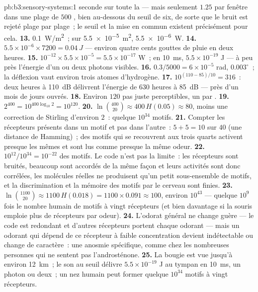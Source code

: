 \begin{solution}{pb:b3:sensory-systems:1}
seconde sur toute la  --- mais seulement $1.25$ par fenêtre dans
une plage de $500$ , bien au-dessous du seuil de six, de sorte
que le bruit est rejeté plage par plage~; le seuil et la mise en commun
existent précisément pour cela.
\textbf{13.} \qty{0.1}{W/m^2}~; sur \qty{5.5e-5}{m^2}, \qty{5.5e-6}{W}.
\textbf{14.} $5.5\times 10^{-6}\times 7200 = \qty{0.04}{J}$ --- environ
quatre cents gouttes de pluie en deux heures.
\textbf{15.} $10^{-12}\times 5.5\times 10^{-5} = 5.5\times 10^{-17}$ W~;
en \qty{10}{ms}, $5.5\times 10^{-19}$ J --- à peu près l'énergie d'un ou
deux photons visibles.
\textbf{16.} $0.3/5000 = 6\times 10^{-5}$ rad, $0.003^{\circ}$~; la
déflexion vaut environ trois atomes d'hydrogène.
\textbf{17.} $10^{(110 - 85)/10} = 316$~: deux heures à \qty{110}{dB}
délivrent l'énergie de $630$ heures à \qty{85}{dB} --- près d'un mois de
jours ouvrés.
\textbf{18.} Environ $120$ pas juste perceptibles, un par .
\textbf{19.} $2^{400} = 10^{400\log_{10}2} = 10^{120}$.
\textbf{20.} $\ln\binom{400}{20} \approx 400\,H(0.05) \approx 80$, moins
une correction de Stirling d'environ $2$~: quelque $10^{34}$ motifs.
\textbf{21.} Compter les récepteurs présents dans un motif et pas dans
l'autre~: $5 +
5 = 10$ sur $40$ (une distance de Hamming)~; des motifs qui se
recouvrent aux trois quarts activent presque les mêmes  et
sont lus comme presque la même odeur.
\textbf{22.} $10^{12}/10^{34} = 10^{-22}$ des motifs. Le code n'est pas
la limite~: les récepteurs sont bruités, beaucoup sont accordés de la
même façon et leurs activités sont donc corrélées, les molécules réelles
ne produisent qu'un petit sous-ensemble de motifs, et la discrimination
et la mémoire des motifs par le cerveau sont finies.
\textbf{23.} $\ln\binom{1100}{20} \approx 1100\,H(0.018) = 1100\times
0.091 \approx 100$, environ $10^{43}$ --- quelque $10^{9}$ fois le
nombre humain de motifs à vingt récepteurs (et bien davantage si la
souris emploie plus de récepteurs par odeur).
\textbf{24.} L'odorat général ne change guère --- le code est redondant
et d'autres récepteurs portent chaque odorant --- mais un odorant qui
dépend de ce récepteur à faible concentration devient indétectable ou
change de caractère~: une anosmie spécifique, comme chez les nombreuses
personnes qui ne sentent pas l'androsténone.
\textbf{25.} La bougie est vue jusqu'à environ \qty{12}{km}~; le son au
seuil délivre $5.5\times 10^{-19}$ J au tympan en \qty{10}{ms}, un
photon ou deux~; un nez humain peut former quelque $10^{34}$ motifs à
vingt récepteurs.
\end{solution}
